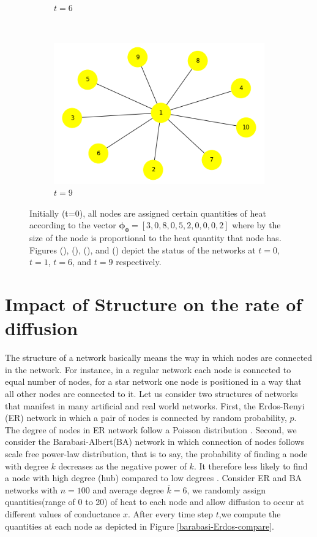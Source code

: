 \documentclass[10pt,a4paper]{article}
\begin{document}
\begin{figure}[!h]
\begin{subfigure}[b]{0.38\textwidth}
		\caption{$t=6$}
		\label{t6}
	\end{subfigure}~
	\begin{subfigure}[b]{0.38\textwidth}
		\includegraphics[width= \textwidth]{images/star-t-9.png}
		\caption{$t=9$}
		\label{t9}
	\end{subfigure}
	\caption{Initially (t=0), all nodes are assigned certain quantities of heat according to the vector $\mathbf{\phi_0} = [3,0,8,0,5,2,0,0,0,2]$ where by the size of the node is proportional to the heat quantity that node has. Figures (), (), (), and () depict the status of the networks at $t=0$, $t=1$, $t=6$, and $t=9$ respectively.}
	\label{visualise}
\end{figure}

\newpage
\section{Impact of Structure on the rate of diffusion}
The structure of a network basically means the way in which nodes are connected in the network. For instance, in a regular network each node is connected to equal number of nodes, for a star network one node is positioned in a way that all other nodes are connected to it.
Let us consider two structures of networks that manifest in many artificial and real world networks.  First, the Erdos-Renyi (ER) network in which a pair of nodes is connected by random probability, $p$. The degree of nodes in ER network follow a Poisson distribution \cite{erdos1960evolution}. Second, we consider the Barabasi-Albert(BA) network in which connection of nodes follows scale free power-law distribution, that is to say, the probability of finding a node with degree $k$ decreases as the negative power of $k$. It therefore less likely to find a node with high degree (hub) compared to low degrees \cite{barabasi1999emergence, estrada2011structure} . 
Consider ER and BA networks with $n=100$ and average degree $\bar{k}= 6$, we randomly assign quantities(range of 0 to 20) of heat to each node and allow diffusion to occur at different values of conductance $x$. After every time step $t$,we compute the quantities at each node as depicted in Figure \ref{barabasi-Erdos-compare}.
 
\end{document}
